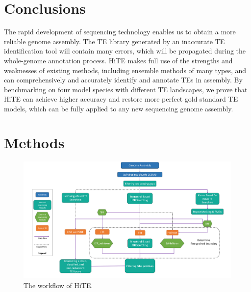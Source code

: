 \documentclass{bmcart}
\begin{document}
\section*{Conclusions}
The rapid development of sequencing technology enables us to obtain a more reliable genome assembly. The TE library generated by an inaccurate TE identification tool will contain many errors, which will be propagated during the whole-genome annotation process. HiTE makes full use of the strengths and weaknesses of existing methods, including ensemble methods of many types, and can comprehensively and accurately identify and annotate TEs in assembly. By benchmarking on four model species with different TE landscapes, we prove that HiTE can achieve higher accuracy and restore more perfect gold standard TE models, which can be fully applied to any new sequencing genome assembly.

\section*{Methods}
\begin{figure}[h!]
	\centerline{\includegraphics[width=1.0\textwidth]{figures/Framework.pdf}}
	\caption{The workflow of HiTE.}
	\label{fig:framework}
\end{figure}
\end{document}
